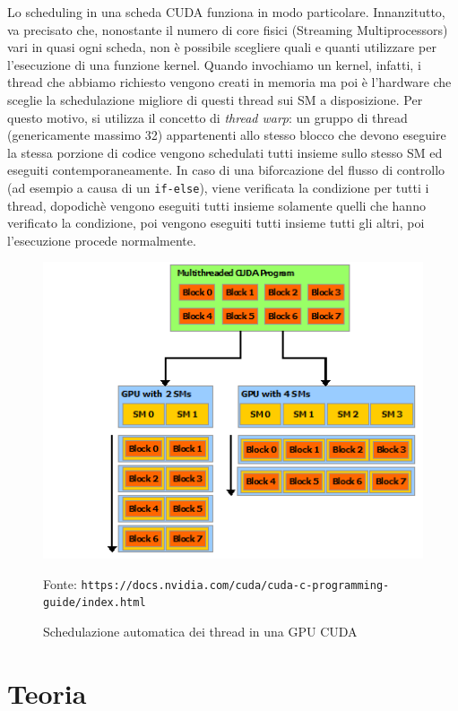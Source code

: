 \documentclass[12pt,a4paper]{book}
\newcommand{\source}[1]{\caption*{Fonte: {\small\texttt{#1}}} }
\begin{document}
	Lo scheduling in una scheda CUDA funziona in modo particolare. Innanzitutto, va precisato che, nonostante il numero di core fisici (Streaming Multiprocessors) vari in quasi ogni scheda, non è possibile scegliere quali e quanti utilizzare per l'esecuzione di una funzione kernel. Quando invochiamo un kernel, infatti, i thread che abbiamo richiesto vengono creati in memoria ma poi è l'hardware che sceglie la schedulazione migliore di questi thread sui SM a disposizione. Per questo motivo, si utilizza il concetto di \textit{thread warp}: un gruppo di thread (genericamente massimo 32) appartenenti allo stesso blocco che devono eseguire la stessa porzione di codice vengono schedulati tutti insieme sullo stesso SM ed eseguiti contemporaneamente. In caso di una biforcazione del flusso di controllo (ad esempio a causa di un \texttt{if-else}), viene verificata la condizione per tutti i thread, dopodichè vengono eseguiti tutti insieme solamente quelli che hanno verificato la condizione, poi vengono eseguiti tutti insieme tutti gli altri, poi l'esecuzione procede normalmente.
	
	\begin{figure}
		\centering
		\includegraphics[width=0.5\linewidth]{automatic-scalability}
		\caption{Schedulazione automatica dei thread in una GPU CUDA}
		\source{https://docs.nvidia.com/cuda/cuda-c-programming-guide/index.html}
		\label{fig:automatic-scalability}
	\end{figure}
	
	\chapter{Teoria}
\end{document}
